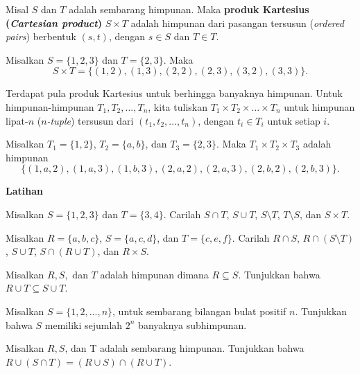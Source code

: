 \begin{defn}
Misal $S$ dan $T$ adalah sembarang himpunan. Maka \textbf{produk Kartesius (\textit{Cartesian product})} $S \times T$ adalah himpunan dari pasangan tersusun (\textit{ordered pairs}) berbentuk $(s, t)$, dengan $s \in S$ dan $T \in T$. 
\end{defn}

\begin{exmp}
Misalkan $S = \{1, 2, 3\}$ dan $T = \{2, 3\}$. Maka
\[S \times T = \{ (1, 2), (1, 3), (2, 2), (2, 3), (3, 2), (3, 3) \}.\]
\end{exmp}

Terdapat pula produk Kartesius untuk berhingga banyaknya himpunan. Untuk himpunan-himpunan $T_1, T_2, ..., T_n$, kita tuliskan $T_1 \times T_2 \times ... \times T_n$ untuk himpunan lipat-$n$ (\textit{$n$-tuple}) tersusun dari $(t_1, t_2, ..., t_n)$, dengan $t_i \in T_i$ untuk setiap $i$.

\begin{exmp}
Misalkan $T_1 = \{1, 2\}$, $T_2 = \{a,b\}$, dan $T_3 = \{2,3\}$. Maka $T_1 \times T_2 \times T_3$ adalah himpunan
\[ \{ (1, a, 2), (1, a, 3), (1, b, 3), (2, a, 2), (2, a, 3), (2, b, 2), (2, b, 3) \}. \]
\end{exmp}
\hfill \break


\textbf{Latihan}

\begin{exc}
Misalkan $S = \{1, 2, 3\}$ dan $T = \{3, 4\}$. Carilah $S \cap T$, $S \cup T$, $S \setminus T$, $T \setminus S$, dan $S \times T$.
\end{exc}

\begin{exc}
Misalkan $R = \{a, b, c\}$, $S = \{a, c, d\}$, dan $T = \{c, e, f\}$. Carilah $R \cap S$, $R \cap (S \setminus T)$, $S \cup T$, $S \cap (R \cup T)$, dan $R \times S$.
\end{exc}

\begin{exc}
Misalkan $R, S,$ dan $T$ adalah himpunan dimana $R \subseteq S$. Tunjukkan bahwa $R \cup T \subseteq S \cup T$.
\end{exc}

\begin{exc}
Misalkan $S = \{1, 2, ..., n\}$, untuk sembarang bilangan bulat positif $n$. Tunjukkan bahwa $S$ memiliki sejumlah $2^n$ banyaknya subhimpunan.
\end{exc}

\begin{exc}
Misalkan $R, S$, dan T adalah sembarang himpunan. Tunjukkan bahwa $R \cup (S \cap T) = ( R \cup S) \cap (R \cup T)$.
\end{exc}

